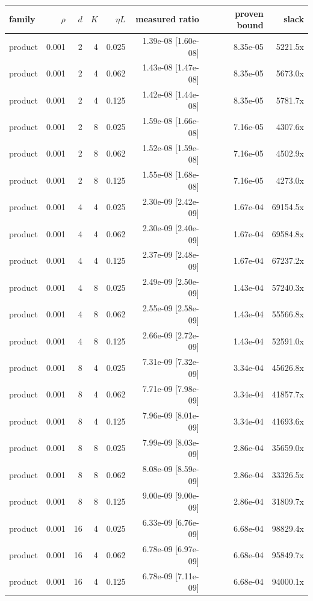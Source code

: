 \begin{tabular}{lrrrrrrr}
\toprule
family & $\rho$ & $d$ & $K$ & $\eta L$ & measured ratio & proven bound & slack \\
\midrule
product & 0.001 & 2 & 4 & 0.025 & 1.39e-08 [1.60e-08] & 8.35e-05 & 5221.5x \\
product & 0.001 & 2 & 4 & 0.062 & 1.43e-08 [1.47e-08] & 8.35e-05 & 5673.0x \\
product & 0.001 & 2 & 4 & 0.125 & 1.42e-08 [1.44e-08] & 8.35e-05 & 5781.7x \\
product & 0.001 & 2 & 8 & 0.025 & 1.59e-08 [1.66e-08] & 7.16e-05 & 4307.6x \\
product & 0.001 & 2 & 8 & 0.062 & 1.52e-08 [1.59e-08] & 7.16e-05 & 4502.9x \\
product & 0.001 & 2 & 8 & 0.125 & 1.55e-08 [1.68e-08] & 7.16e-05 & 4273.0x \\
product & 0.001 & 4 & 4 & 0.025 & 2.30e-09 [2.42e-09] & 1.67e-04 & 69154.5x \\
product & 0.001 & 4 & 4 & 0.062 & 2.30e-09 [2.40e-09] & 1.67e-04 & 69584.8x \\
product & 0.001 & 4 & 4 & 0.125 & 2.37e-09 [2.48e-09] & 1.67e-04 & 67237.2x \\
product & 0.001 & 4 & 8 & 0.025 & 2.49e-09 [2.50e-09] & 1.43e-04 & 57240.3x \\
product & 0.001 & 4 & 8 & 0.062 & 2.55e-09 [2.58e-09] & 1.43e-04 & 55566.8x \\
product & 0.001 & 4 & 8 & 0.125 & 2.66e-09 [2.72e-09] & 1.43e-04 & 52591.0x \\
product & 0.001 & 8 & 4 & 0.025 & 7.31e-09 [7.32e-09] & 3.34e-04 & 45626.8x \\
product & 0.001 & 8 & 4 & 0.062 & 7.71e-09 [7.98e-09] & 3.34e-04 & 41857.7x \\
product & 0.001 & 8 & 4 & 0.125 & 7.96e-09 [8.01e-09] & 3.34e-04 & 41693.6x \\
product & 0.001 & 8 & 8 & 0.025 & 7.99e-09 [8.03e-09] & 2.86e-04 & 35659.0x \\
product & 0.001 & 8 & 8 & 0.062 & 8.08e-09 [8.59e-09] & 2.86e-04 & 33326.5x \\
product & 0.001 & 8 & 8 & 0.125 & 9.00e-09 [9.00e-09] & 2.86e-04 & 31809.7x \\
product & 0.001 & 16 & 4 & 0.025 & 6.33e-09 [6.76e-09] & 6.68e-04 & 98829.4x \\
product & 0.001 & 16 & 4 & 0.062 & 6.78e-09 [6.97e-09] & 6.68e-04 & 95849.7x \\
product & 0.001 & 16 & 4 & 0.125 & 6.78e-09 [7.11e-09] & 6.68e-04 & 94000.1x \\

\end{tabular}

